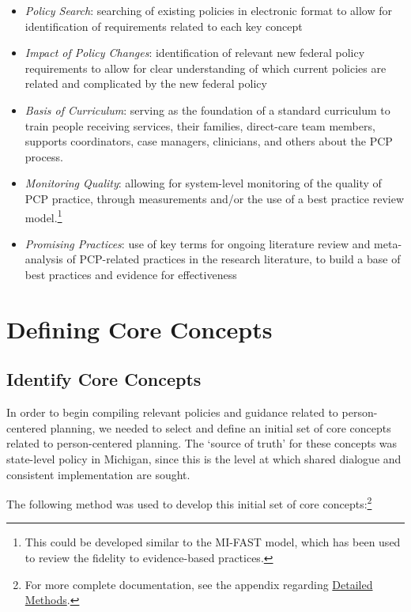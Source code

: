\documentclass[
]{book}
\providecommand{\tightlist}{%
  \setlength{\itemsep}{0pt}\setlength{\parskip}{0pt}}
\begin{document}
\begin{itemize}
\tightlist
\item
  \emph{Policy Search}: searching of existing policies in electronic format to allow for identification of requirements related to each key concept
\item
  \emph{Impact of Policy Changes}: identification of relevant new federal policy requirements to allow for clear understanding of which current policies are related and complicated by the new federal policy
\item
  \emph{Basis of Curriculum}: serving as the foundation of a standard curriculum to train people receiving services, their families, direct-care team members, supports coordinators, case managers, clinicians, and others about the PCP process.
\item
  \emph{Monitoring Quality}: allowing for system-level monitoring of the quality of PCP practice, through measurements and/or the use of a best practice review model.\footnote{This could be developed similar to the MI-FAST model, which has been used to review the fidelity to evidence-based practices.}
\item
  \emph{Promising Practices}: use of key terms for ongoing literature review and meta-analysis of PCP-related practices in the research literature, to build a base of best practices and evidence for effectiveness
\end{itemize}

\hypertarget{defining-core-concepts}{%
\section{Defining Core Concepts}\label{defining-core-concepts}}

\hypertarget{identify-core-concepts}{%
\subsection{Identify Core Concepts}\label{identify-core-concepts}}

In order to begin compiling relevant policies and guidance related to person-centered planning, we needed to select and define an initial set of core concepts related to person-centered planning. The `source of truth' for these concepts was state-level policy in Michigan, since this is the level at which shared dialogue and consistent implementation are sought.

The following method was used to develop this initial set of core concepts:\footnote{For more complete documentation, see the appendix regarding \protect\hyperlink{methods}{Detailed Methods}.}
\end{document}
